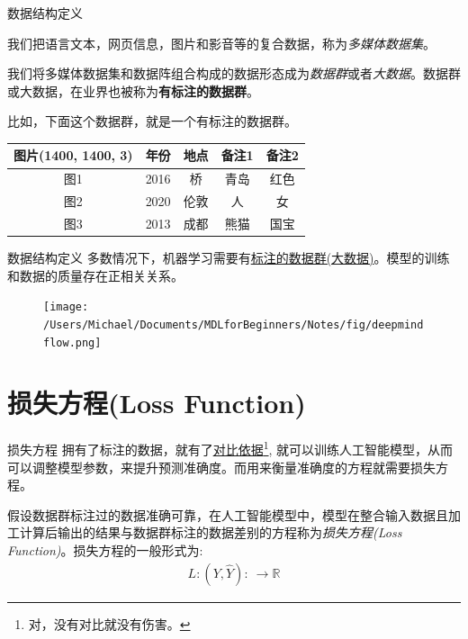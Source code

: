 \documentclass[handout]{beamer}
\newcommand{\rn}{\mathbb{R}}
\begin{document}
\begin{frame}{数据结构定义}
\begin{definition}
	我们把语言文本，网页信息，图片和影音等的复合数据，称为\textit{多媒体数据集}。
\end{definition}

\begin{definition}
	我们将多媒体数据集和数据阵组合构成的数据形态成为\textit{数据群}或者\textit{大数据}。数据群或大数据，在业界也被称为\textbf{有标注的数据群}。
\end{definition}
比如，下面这个数据群，就是一个有标注的数据群。
{\footnotesize
\begin{table}[H]
	\centering
	\renewcommand{\arraystretch}{1.5}
	\begin{tabular}{ccccc}
	\hline 
		图片(1400, 1400, 3) & 年份 & 地点 & 备注1 & 备注2 \\
		\hline 
		图1 & 2016 & 桥 & 青岛 & 红色 \\
		图2 & 2020 &  伦敦 & 人 & 女 \\
		图3 & 2013 & 成都& 熊猫 & 国宝\\
		\hline 
	\end{tabular}
\end{table}
}
\end{frame}

\begin{frame}{数据结构定义}
多数情况下，机器学习需要有\underline{标注的数据群(大数据)}。模型的训练和数据的质量存在正相关关系。
\begin{figure}[H]
	\centering
	\texttt{[image: /Users/Michael/Documents/MDLforBeginners/Notes/fig/deepmindflow.png]}
\end{figure}
\end{frame}


\section{损失方程(Loss Function)}

\begin{frame}{损失方程}
拥有了标注的数据，就有了\underline{对比依据}\footnote[frame]{对，没有对比就没有伤害。}, 就可以训练人工智能模型，从而可以调整模型参数，来提升预测准确度。而用来衡量准确度的方程就需要损失方程。

\hfil

\begin{definition}
	假设数据群标注过的数据准确可靠，在人工智能模型中，模型在整合输入数据且加工计算后输出的结果与数据群标注的数据差别的方程称为\textit{损失方程(Loss Function)}。损失方程的一般形式为:
\begin{align*}
	L: (Y, \hat{Y}): \ \to \rn 
\end{align*}	
\end{definition}
\end{frame}
\end{document}
